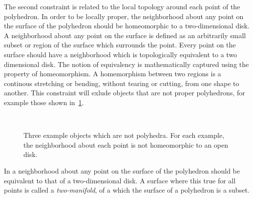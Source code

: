 The second constraint is related to the local topology around each point of the polyhedron.
In order to be locally proper, the neighborhood about any point on the surface of the polyhedron should be homeomorphic to a two-dimensional disk.
A neighborhood about any point on the surface is defined as an arbitrarily small subset or region of the surface which surrounds the point.
Every point on the surface should have a neighborhood which is topologically equivalent to a two dimensional disk.
The notion of equivalency is mathematically captured using the property of \gls{homeomorphism}.
A homemorphism between two regions is a continous stretching or bending, without tearing or cutting, from one shape to another.
This constraint will exlude objects that are not proper polyhedrons, for example those shown in~\cref{fig:improper_polyhedrons}.
\begin{figure}[h]
    \centering
    ~
    ~
    \caption{Three example objects which are not polyhedra. For each example, the neighborhood about each point is not homeomorphic to an open disk.~\label{fig:improper_polyhedrons}}
\end{figure}
In a neighborhood about any point on the surface of the polyhedron should be equivalent to that of a two-dimensional disk.
A surface where this true for all points is called a \textit{two-manifold}, of a which the surface of a polyhedron is a subset.

